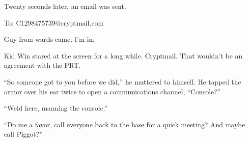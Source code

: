 Twenty seconds later, an email was sent.



To: C1298475739@cryptmail.com



Guy from wards came.  I'm in.



Kid Win stared at the screen for a long while.  Cryptmail.  That wouldn't be an agreement with the PRT.



``So someone got to you before we did,'' he muttered to himself.  He tapped the armor over his ear twice to open a communications channel, ``Console?''



``Weld here, manning the console.''



``Do me a favor, call everyone back to the base for a quick meeting?  And maybe call Piggot?''





